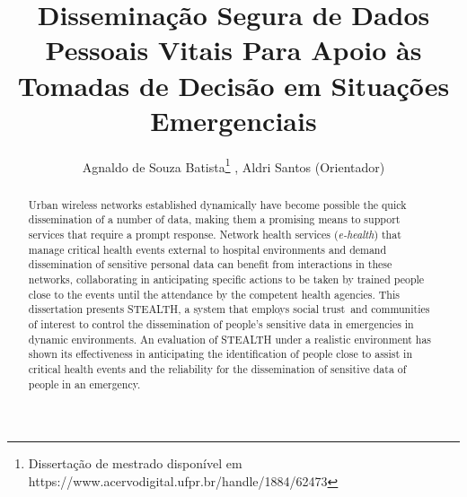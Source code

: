 \documentclass[12pt]{article}
\title{Disseminação Segura de Dados Pessoais Vitais Para Apoio às Tomadas de Decisão em Situações Emergenciais}
\author{Agnaldo de Souza Batista\inst{1}\thanks{{Dissertação de mestrado disponível em https://www.acervodigital.ufpr.br/handle/1884/62473}}\,\,, Aldri Santos\inst{1} (Orientador)}
\begin{document}
 
\pagestyle{myheadings} %
\maketitle

\begin{abstract}
Urban wireless networks established dynamically have become possible the 
quick dissemination of a number of 
data, making them a promising means to support services that require a prompt response. Network health services (\textit{e-health}) that manage critical health events external to hospital environments and demand dissemination of sensitive personal data can benefit from interactions in these networks, collaborating in anticipating specific actions to be taken by trained people close to the events until the attendance by the competent health agencies. This dissertation presents STEALTH, a system that employs social trust~and communities of interest to control the dissemination of people's sensitive data in emergencies in dynamic environments. An evaluation of STEALTH under a realistic environment has shown its effectiveness in anticipating the identification of people close to assist in critical health events and the reliability for the dissemination of sensitive data of people in an emergency.



\end{abstract}
\end{document}
